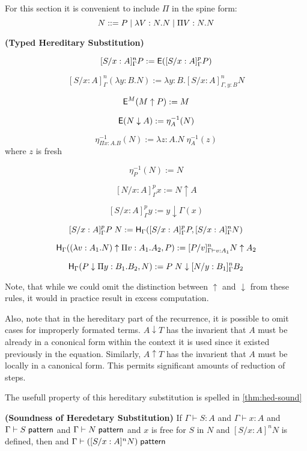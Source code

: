 For this section it is convenient to include $\Pi$ in the spine form: 
\[
N ::= P 
\; | \; \lambda V : N . N 
\; | \; \Pi V : N . N 
\]


\begin{definition}
\textbf{(Typed Hereditary Substitution)}

\[
[S / x : A]^n_{\Gamma } P := \mathsf{E}([S / x : A]^p_{\Gamma } P)
\]

\[
[S / x : A]^n_{\Gamma } (\lambda y : B . N) := \lambda y:B . [S / x : A]^n_{\Gamma, y : B} N
\]

\[
\mathsf{E}^M(M \uparrow P) := M
\]

\[
\mathsf{E}(N \downarrow A) := \eta^{-1}_A (N)
\]

\[
\eta^{-1}_{\Pi x : A . B}(N) := \lambda z : A . N \; \eta^{-1}_A(z)
\] where $z$ is fresh

\[
\eta^{-1}_{P}(N) := N
\]

\[ 
[ N / x : A]^p_{\Gamma} x := N \uparrow A
\]

\[
[S / x : A]^p_{\Gamma} y := y \downarrow \Gamma(x)
\] 

\[
[S / x : A]^p_{\Gamma } P\;N := 
\mathsf{H}_{\Gamma} ( [S/x : A]^p_{\Gamma} P , [S/x : A]^n_{\Gamma} N) 
\]

\[
\mathsf{H}_{\Gamma} ((\lambda v : A_1 . N) \uparrow \Pi v : A_1 . A_2 , P) 
:= [P/v]^n_{\Gamma \vdash v : A_1} N \uparrow A_2
\]

\[
\mathsf{H}_{\Gamma}(P \downarrow \Pi y : B_1 . B_2 , N) := P\; N \downarrow [N/y : B_1]^n_{\Gamma}B_2
\]

\label{def:tyhered}
\end{definition}

Note, that while we could omit the distinction between $\uparrow$ and $\downarrow$ from
these rules, it would in practice result in excess computation.

Also, note that in the hereditary part of the recurrence, 
it is possible to omit cases for improperly formated terms.  $A \downarrow T$ has the invarient that
$A$ must be already in a cononical form within the context it is used since it existed previously in the
equation.  Similarly, $A \uparrow T$ has the invarient that $A$ must be locally in a canonical form.
This permits significant amounts of reduction of steps.

The usefull property of this hereditary substitution is spelled in \ref{thm:hed-sound}

\begin{theorem}
\textbf{(Soundness of Heredetary Substitution)}
If  $\Gamma \vdash S : A$ 
and $\Gamma \vdash x : A$ 
and $\Gamma \vdash S \; \mathsf{pattern}$ 
and $\Gamma \vdash N \; \mathsf{pattern}$ 
and $x$ is free for $S$ in $N$
and $[S / x : A]^n N$ is defined, 
then
and $\Gamma \vdash ([S / x : A]^n N) \; \mathsf{pattern}$ 
\label{thm:hed-sound}
\end{theorem}

